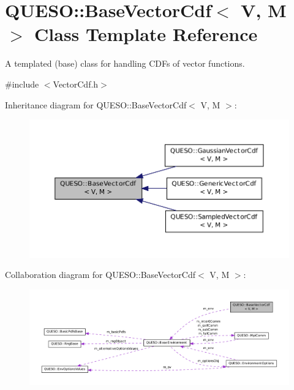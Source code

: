 \hypertarget{class_q_u_e_s_o_1_1_base_vector_cdf}{\section{Q\-U\-E\-S\-O\-:\-:Base\-Vector\-Cdf$<$ V, M $>$ Class Template Reference}
\label{class_q_u_e_s_o_1_1_base_vector_cdf}
}


A templated (base) class for handling C\-D\-Fs of vector functions.  




{\ttfamily \#include $<$Vector\-Cdf.\-h$>$}



Inheritance diagram for Q\-U\-E\-S\-O\-:\-:Base\-Vector\-Cdf$<$ V, M $>$\-:
\nopagebreak
\begin{figure}[H]
\begin{center}
\leavevmode
\includegraphics[width=350pt]{class_q_u_e_s_o_1_1_base_vector_cdf__inherit__graph}
\end{center}
\end{figure}


Collaboration diagram for Q\-U\-E\-S\-O\-:\-:Base\-Vector\-Cdf$<$ V, M $>$\-:
\nopagebreak
\begin{figure}[H]
\begin{center}
\leavevmode
\includegraphics[width=350pt]{class_q_u_e_s_o_1_1_base_vector_cdf__coll__graph}
\end{center}
\end{figure}
